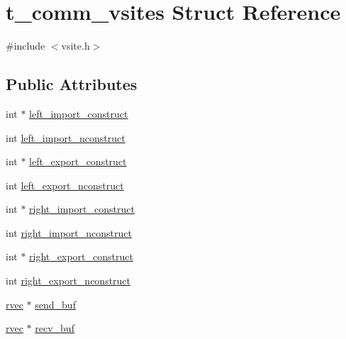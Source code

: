 \hypertarget{structt__comm__vsites}{\section{t\-\_\-comm\-\_\-vsites \-Struct \-Reference}
\label{structt__comm__vsites}
}


{\ttfamily \#include $<$vsite.\-h$>$}

\subsection*{\-Public \-Attributes}
\begin{DoxyCompactItemize}
\item 
int $\ast$ \hyperlink{structt__comm__vsites_ac364421846f36eeb74e4c4330d714ecb}{left\-\_\-import\-\_\-construct}
\item 
int \hyperlink{structt__comm__vsites_aade6de16ea4ddee0da15b4ec67410c4e}{left\-\_\-import\-\_\-nconstruct}
\item 
int $\ast$ \hyperlink{structt__comm__vsites_a2a637e1a2f7f57baee58e1540453176f}{left\-\_\-export\-\_\-construct}
\item 
int \hyperlink{structt__comm__vsites_a554e867aab5696a08ab42d9742bdd78b}{left\-\_\-export\-\_\-nconstruct}
\item 
int $\ast$ \hyperlink{structt__comm__vsites_a0a791c12c7a4054c0922bc7370a2cdad}{right\-\_\-import\-\_\-construct}
\item 
int \hyperlink{structt__comm__vsites_a1684962fedc1259eead9bc07746c7195}{right\-\_\-import\-\_\-nconstruct}
\item 
int $\ast$ \hyperlink{structt__comm__vsites_a6c37dabf21721399a7307da290494faf}{right\-\_\-export\-\_\-construct}
\item 
int \hyperlink{structt__comm__vsites_ab71d88c201bb6076ba950cd2646173dc}{right\-\_\-export\-\_\-nconstruct}
\item 
\hyperlink{share_2template_2gromacs_2types_2simple_8h_aa02a552a4abd2f180c282a083dc3a999}{rvec} $\ast$ \hyperlink{structt__comm__vsites_a12beb1d9681bc5e7cd99431a49984bb8}{send\-\_\-buf}
\item 
\hyperlink{share_2template_2gromacs_2types_2simple_8h_aa02a552a4abd2f180c282a083dc3a999}{rvec} $\ast$ \hyperlink{structt__comm__vsites_aa0207e4bff7d38943ba7f2e0e2ac93ad}{recv\-\_\-buf}
\end{DoxyCompactItemize}


